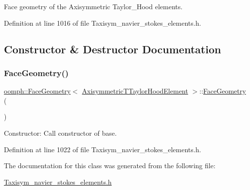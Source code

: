 Face geometry of the Axisymmetric Taylor\+\_\+\+Hood elements. 

Definition at line 1016 of file Taxisym\+\_\+navier\+\_\+stokes\+\_\+elements.\+h.



\subsection{Constructor \& Destructor Documentation}
\mbox{\label{classoomph_1_1FaceGeometry_3_01AxisymmetricTTaylorHoodElement_01_4_aa94b9d3d1d05bc595a22ccbd0a1b0c78}} 
\subsubsection{\texorpdfstring{Face\+Geometry()}{FaceGeometry()}}
{\footnotesize\ttfamily \hyperlink{classoomph_1_1FaceGeometry}{oomph\+::\+Face\+Geometry}$<$ \hyperlink{classoomph_1_1AxisymmetricTTaylorHoodElement}{Axisymmetric\+T\+Taylor\+Hood\+Element} $>$\+::\hyperlink{classoomph_1_1FaceGeometry}{Face\+Geometry} (\begin{DoxyParamCaption}{ }\end{DoxyParamCaption})\hspace{0.3cm}{\ttfamily [inline]}}



Constructor\+: Call constructor of base. 



Definition at line 1022 of file Taxisym\+\_\+navier\+\_\+stokes\+\_\+elements.\+h.



The documentation for this class was generated from the following file\+:\begin{DoxyCompactItemize}
\item 
\hyperlink{Taxisym__navier__stokes__elements_8h}{Taxisym\+\_\+navier\+\_\+stokes\+\_\+elements.\+h}\end{DoxyCompactItemize}
